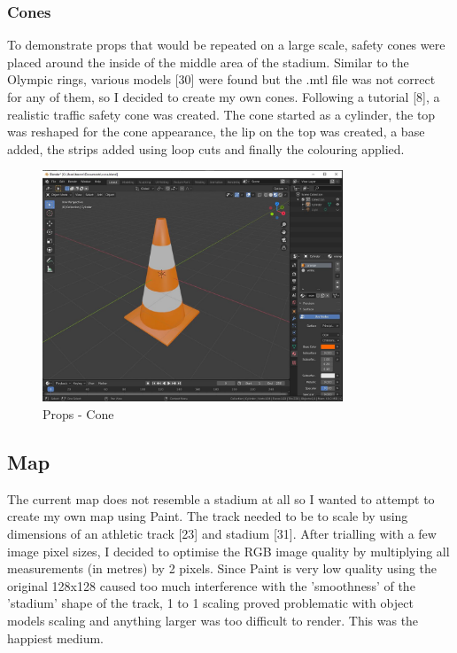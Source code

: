 \documentclass[a4 paper, 12pt]{article}
\begin{document}
\subsubsection{Cones}
To demonstrate props that would be repeated on a large scale, safety cones were placed around the inside of the middle area of the stadium. Similar to the Olympic rings, various models [30] were found but the .mtl file was not correct for any of them, so I decided to create my own cones. Following a tutorial [8], a realistic traffic safety cone was created. The cone started as a cylinder, the top was reshaped for the cone appearance, the lip on the top was created, a base added, the strips added using loop cuts and finally the colouring applied.
    \begin{figure} [H]
        \centering
        \includegraphics[width=0.8\textwidth, frame]
            {./images/olympics/cone_blend.jpg}
        \caption{Props - Cone}   
    \end{figure}

\subsection{Map}
The current map does not resemble a stadium at all so I wanted to attempt to create my own map using Paint. The track needed to be to scale by using dimensions of an athletic track [23] and stadium [31]. After trialling with a few image pixel sizes, I decided to optimise the RGB image quality by multiplying all measurements (in metres) by 2 pixels. Since Paint is very low quality using the original 128x128 caused too much interference with the 'smoothness' of the 'stadium' shape of the track, 1 to 1 scaling proved problematic with object models scaling and anything larger was too difficult to render. This was the happiest medium.
 
\end{document}
